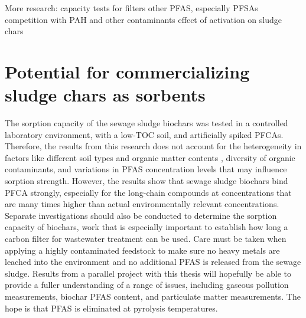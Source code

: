 More research:
capacity tests for filters
other PFAS, especially PFSAs
competition with PAH and other contaminants
effect of activation on sludge chars

\section{Potential for commercializing sludge chars as sorbents}
The sorption capacity of the sewage sludge biochars was tested in a controlled laboratory environment, with a low-TOC soil, and artificially spiked PFCAs. Therefore, the results from this research does not account for the heterogeneity in factors like different soil types and organic matter contents \citep{Sormo2021}, diversity of organic contaminants, and variations in PFAS concentration levels that may influence sorption strength. However, the results show that sewage sludge biochars bind PFCA strongly, especially for the long-chain compounds at concentrations that are many times higher than actual environmentally relevant concentrations. Separate investigations should also be conducted to determine the sorption capacity of biochars, work that is especially important to establish how long a carbon filter for wastewater treatment can be used. Care must be taken when applying a highly contaminated feedstock to make sure no heavy metals are leached into the environment and no additional PFAS is released from the sewage sludge. Results from a parallel project with this thesis will hopefully be able to provide a fuller understanding of a range of issues, including gaseous pollution measurements, biochar PFAS content, and particulate matter measurements. The hope is that PFAS is eliminated at pyrolysis temperatures.

